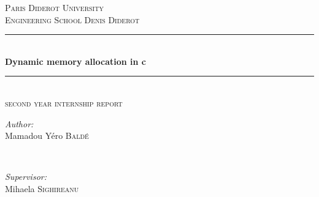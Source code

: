 \documentclass[11pt]{article}
\begin{document}
\begin{titlepage}

\newcommand{\HRule}{\rule{\linewidth}{0.5mm}} %

\center %
 

\textsc{\LARGE Paris Diderot University}\\[1.5cm]
\textsc{\Large Engineering School Denis Diderot}\\[0.5cm] 



\HRule \\[0.4cm]
{ \huge \bfseries Dynamic memory allocation in c}\\[0.4cm] 
\HRule \\[1.5cm]
 
 \textsc{\large second year internship report}\\[1.5cm] 

\begin{minipage}{0.4\textwidth}
\begin{flushleft} \large
\emph{Author:}\\
Mamadou Yéro \textsc{Baldé} %
\end{flushleft}
\end{minipage}
~
\begin{minipage}{0.4\textwidth}
\begin{flushright} \large
\emph{Supervisor:} \\
Mihaela \textsc{Sighireanu} %
\end{flushright}
\end{minipage}\\[2cm]



\end{titlepage}
\end{document}
